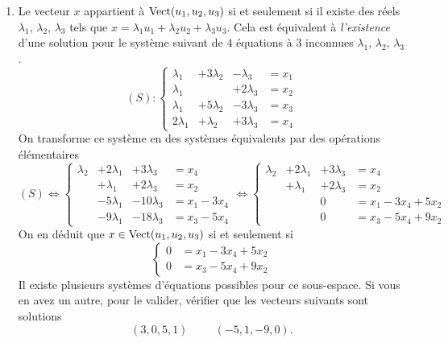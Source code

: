 \begin{enumerate}
 \item Le vecteur $x$ appartient à $\operatorname{Vect}(u_1,u_2,u_3)$ si et seulement si il existe des réels $\lambda_1$, $\lambda_2$, $\lambda_3$ tels que $x=\lambda_1u_1+\lambda_2u_2+\lambda_3u_3$. Cela est équivalent à \emph{l'existence} d'une solution pour le système suivant de $4$ équations à $3$ inconnues $\lambda_1$, $\lambda_2$, $\lambda_3$.
\begin{displaymath}
 (S):\left\lbrace 
\begin{aligned}
 \lambda_1  &+ 3\lambda_2 &- \lambda_3   &= x_1\\
 \lambda_1  &             &+ 2\lambda_3 &= x_2\\
 \lambda_1  &+ 5\lambda_2 &- 3\lambda_3 &= x_3\\
 2\lambda_1 &+  \lambda_2 &+ 3\lambda_3 &= x_4
\end{aligned}
\right. 
\end{displaymath}
On transforme ce système en des systèmes équivalents par des opérations élémentaires
\begin{displaymath}
 (S)\Leftrightarrow\left\lbrace 
\begin{aligned}
 \lambda_2  &+ 2\lambda_1 &+ 3\lambda_3 &= x_4\\
            &+   \lambda_1 &+ 2\lambda_3 &= x_2\\
            &- 5\lambda_1 &- 10\lambda_3 &= x_1-3x_4\\
            &- 9\lambda_1 &- 18\lambda_3 &= x_3-5x_4
\end{aligned}
\right.
\Leftrightarrow\left\lbrace 
\begin{aligned}
 \lambda_2  &+ 2\lambda_1 &+ 3\lambda_3 &= x_4\\
            &+  \lambda_1 &+ 2\lambda_3 &= x_2\\
            &             &         0   &= x_1-3x_4+5x_2\\
            &             &         0   &= x_3-5x_4+9x_2
\end{aligned}
\right. 
\end{displaymath}
On en déduit que $x \in \operatorname{Vect}(u_1,u_2,u_3)$ si et seulement si
\begin{displaymath}
 \left\lbrace 
\begin{aligned}
 0   &= x_1-3x_4+5x_2\\
 0   &= x_3-5x_4+9x_2
\end{aligned}
\right. 
\end{displaymath}
Il existe plusieurs systèmes d'équations possibles pour ce sous-espace. Si vous en avez un autre, pour le valider, vérifier que les vecteurs suivants sont solutions
\[
 (3,0,5,1) \hspace{1cm} (-5,1,-9,0).
\]


\end{enumerate}
